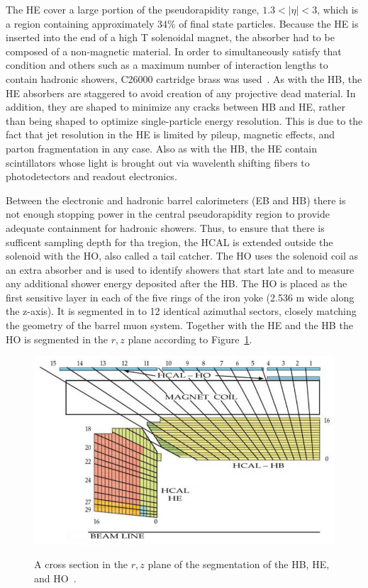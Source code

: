 The HE cover a large portion of the pseudorapidity range, $1.3 < |\eta| < 3$, which is a region containing approximately 34\% of final state particles.  Because the HE is inserted into the end of a high T solenoidal magnet, the absorber had to be composed of a non-magnetic material.  In order to simultaneously satisfy that condition and others such as a maximum number of interaction lengths to contain hadronic showers, C26000 cartridge brass was used~\cite{CMSdetector}.  As with the HB, the HE absorbers are staggered to avoid creation of any projective dead material.  In addition, they are shaped to minimize any cracks between HB and HE, rather than being shaped to optimize single-particle energy resolution.  This is due to the fact that jet resolution in the HE is limited by pileup, magnetic effects, and parton fragmentation in any case.  Also as with the HB, the HE contain scintillators whose light is brought out via wavelenth shifting fibers to photodetectors and readout electronics.  

Between the electronic and hadronic barrel calorimeters (EB and HB) there is not enough stopping power in the central pseudorapidity region to provide adequate containment for hadronic showers.  Thus, to ensure that there is sufficent sampling depth for tha tregion, the HCAL is extended outside the solenoid with the HO, also called a tail catcher.  The HO uses the solenoid coil as an extra absorber and is used to identify showers that start late and to measure any additional shower energy deposited after the HB.  The HO is placed as the first sensitive layer in each of the five rings of the iron yoke (2.536 m wide along the z-axis).  It is segmented in to 12 identical azimuthal sectors, closely matching the geometry of the barrel muon system.  Together with the HE and the HB the HO is segmented in the $r,z$ plane according to Figure~\ref{figapp:HCALsegmentation}.  



\begin{figure}[!Hh]
       \includegraphics[scale=0.6]{Figures/HCALsegmentation.png} \\
       \caption[Segmentation of the CMS hadronic calorimeter.]{A cross section in the $r,z$ plane of the segmentation of the HB, HE, and HO~\cite{CMSdetector}.}
\label{figapp:HCALsegmentation}
\end{figure}


